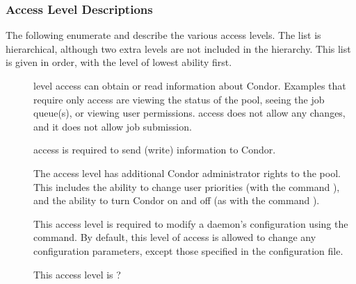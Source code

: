 \subsubsection{\label{sec:Security-access-levels} Access Level Descriptions}
The following enumerate and describe the various access levels.
The list is hierarchical, although two extra levels are
not included in the hierarchy.
This list is given in order, with the level of lowest ability first.

\begin{description}

\item[] \label{dcperm:read}  level
   access can obtain or read information about Condor.
   Examples that require only  access are
   viewing the status of the pool, seeing the job queue(s),
   or viewing user permissions.
    access does not allow any
   changes, and it does not allow job submission.

\item[] \label{dcperm:write}  access
   is required to send (write) information to Condor.

\item[] \label{dcperm:administrator} The
    access level has additional Condor
   administrator rights to the pool.  This includes the ability to
   change user priorities (with the command ),
   and the ability to turn Condor on and off
   (as with the command ).

\item[] \label{dcperm:config} This access level is
   required to modify a daemon's configuration using
   the  command.
   By default, this level of access is allowed
   to change any configuration parameters, except those specified in
   the  configuration file.

\item[] \label{dcperm:config} This access level is ?

\end{description}

